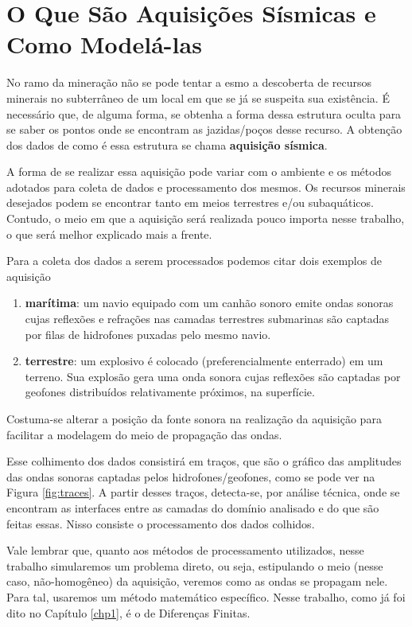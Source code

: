 \section{O Que São Aquisições Sísmicas e Como Modelá-las}

	No ramo da mineração não se pode tentar a esmo a descoberta de recursos
	minerais no subterrâneo de um local em que se já se suspeita sua existência.
	É necessário que, de alguma forma, se obtenha a forma dessa estrutura oculta
	para se saber os pontos onde se encontram as jazidas/poços desse recurso.
	A obtenção dos dados de como é essa estrutura se chama \textbf{aquisição
	sísmica}.

	A forma de se realizar essa aquisição pode variar com o ambiente e os
	métodos adotados para coleta de dados e processamento dos mesmos. Os
	recursos minerais desejados podem se encontrar tanto em meios terrestres
	e/ou subaquáticos. Contudo, o meio em que a aquisição será realizada pouco
	importa nesse trabalho, o que será melhor explicado mais a frente.

	Para a coleta dos dados a serem processados podemos citar dois exemplos
	de aquisição
	\begin{enumerate}
		\item \textbf{marítima}: um navio equipado com um canhão
		sonoro emite ondas sonoras cujas reflexões e refrações nas camadas
		terrestres submarinas são captadas por filas de hidrofones puxadas pelo
		mesmo navio.

		\item \textbf{terrestre}: um explosivo é colocado (preferencialmente
		enterrado) em um terreno. Sua explosão gera uma onda sonora cujas
		reflexões são captadas por geofones distribuídos relativamente próximos,
		na superfície.
	\end{enumerate}
	Costuma-se alterar a posição da fonte sonora na realização da aquisição para
	 facilitar a modelagem do meio de propagação das
	ondas.

	Esse colhimento dos dados consistirá em traços, que são o gráfico das amplitudes
	das ondas sonoras captadas pelos hidrofones/geofones, como se pode ver na Figura 
	\ref{fig:traces}. A partir desses traços, detecta-se, por análise técnica, onde se 
	encontram as interfaces entre as camadas do domínio analisado e do que são feitas 
	essas. Nisso consiste o processamento dos dados colhidos.

	Vale lembrar que, quanto aos métodos de processamento utilizados,  nesse trabalho simularemos um problema
	direto, ou seja, estipulando o meio (nesse caso, não-homogêneo) da aquisição,
	veremos como as ondas se propagam nele. Para tal, usaremos um método
	matemático específico. Nesse trabalho, como já foi dito no Capítulo
	\ref{chp1}, é o de Diferenças Finitas.